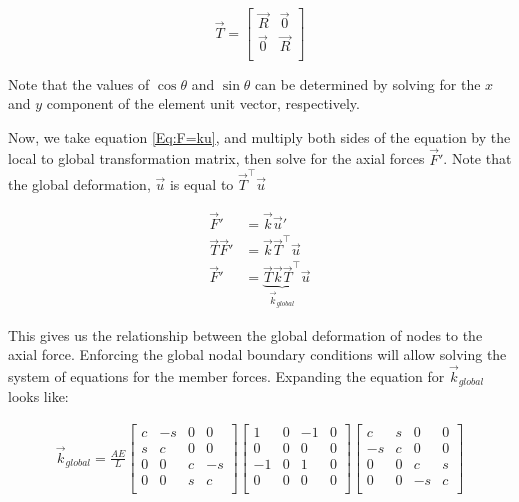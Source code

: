 \begin{equation}
	\vec{T}
	=	
	\begin{bmatrix}
		\vec{R} & \vec{0}\\
		\vec{0} & \vec{R}\\
	\end{bmatrix}
\end{equation}

Note that the values of $\cos\theta$ and $\sin\theta$ can be determined by solving for the $x$ and $y$ component of the element unit vector, respectively. 

Now, we take equation \ref{Eq:F=ku}, and multiply both sides of the equation by the local to global transformation matrix, then solve for the axial forces $\vec{F}'$. Note that the global deformation, $\vec{u}$ is equal to $\vec{T}^\intercal \vec{u}$

\begin{align}
	\vec{F}' &= \vec{k} \vec{u}'\\
	\vec{T} \vec{F}' &= \vec{k} \vec{T}^\intercal \vec{u}\\
	\vec{F}' &= \underbrace{\vec{T} \vec{k} \vec{T}^\intercal}_{\vec{k}_{global}} \vec{u}
\end{align}

This gives us the relationship between the global deformation of nodes to the axial force. Enforcing the global nodal boundary conditions will allow solving the system of equations for the member forces. Expanding the equation for $\vec{k}_{global}$ looks like:

\begin{align*}
\vec{k}_{global}
=
\frac{AE}{L}
	\begin{bmatrix}
  		c & -s & 0 & 0\\
  		s & c & 0 & 0\\
  		0 & 0 & c & -s\\
  		0 & 0 & s & c\\
	\end{bmatrix}
	\begin{bmatrix}
  		1 & 0 & -1 & 0\\
  		0 & 0 & 0 & 0\\
  		-1 & 0 & 1 & 0\\
  		0 & 0 & 0 & 0\\
	\end{bmatrix}
	\begin{bmatrix}
  		c & s & 0 & 0\\
  		-s & c & 0 & 0\\
  		0 & 0 & c & s\\
  		0 & 0 & -s & c\\
\end{bmatrix}
\end{align*}

